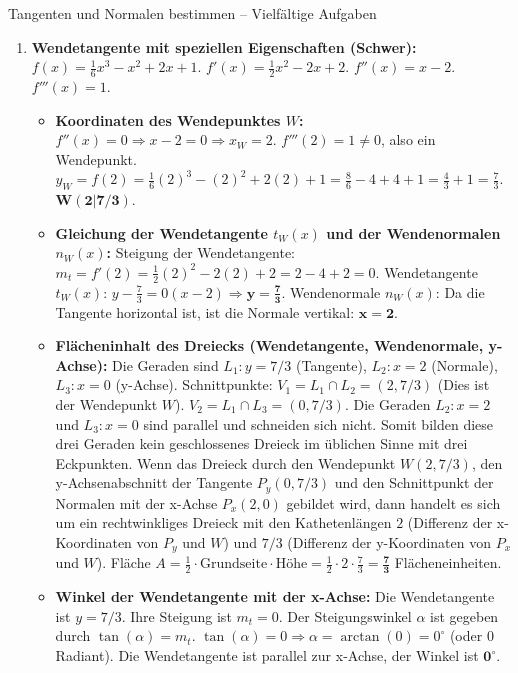 \begin{loesungsumgebung}{Tangenten und Normalen bestimmen – Vielfältige Aufgaben}
\begin{enumerate}[label=(\alph*)]
    \item \textbf{Wendetangente mit speziellen Eigenschaften (Schwer):}
    $f(x) = \frac{1}{6}x^3 - x^2 + 2x + 1$.
    $f'(x) = \frac{1}{2}x^2 - 2x + 2$.
    $f''(x) = x - 2$.
    $f'''(x) = 1$.
    \begin{itemize}
        \item \textbf{Koordinaten des Wendepunktes $W$:}
        $f''(x)=0 \Rightarrow x-2=0 \Rightarrow x_W=2$.
        $f'''(2)=1 \neq 0$, also ein Wendepunkt.
        $y_W = f(2) = \frac{1}{6}(2)^3 - (2)^2 + 2(2) + 1 = \frac{8}{6} - 4 + 4 + 1 = \frac{4}{3} + 1 = \frac{7}{3}$.
        $\mathbf{W(2 | 7/3)}$.
        \item \textbf{Gleichung der Wendetangente $t_W(x)$ und der Wendenormalen $n_W(x)$:}
        Steigung der Wendetangente: $m_t = f'(2) = \frac{1}{2}(2)^2 - 2(2) + 2 = 2 - 4 + 2 = 0$.
        Wendetangente $t_W(x)$: $y - \frac{7}{3} = 0(x-2) \Rightarrow \mathbf{y = \frac{7}{3}}$.
        Wendenormale $n_W(x)$: Da die Tangente horizontal ist, ist die Normale vertikal: $\mathbf{x = 2}$.
        \item \textbf{Flächeninhalt des Dreiecks (Wendetangente, Wendenormale, y-Achse):}
        Die Geraden sind $L_1: y=7/3$ (Tangente), $L_2: x=2$ (Normale), $L_3: x=0$ (y-Achse).
        Schnittpunkte:
        $V_1 = L_1 \cap L_2 = (2, 7/3)$ (Dies ist der Wendepunkt $W$).
        $V_2 = L_1 \cap L_3 = (0, 7/3)$.
        Die Geraden $L_2: x=2$ und $L_3: x=0$ sind parallel und schneiden sich nicht. Somit bilden diese drei Geraden kein geschlossenes Dreieck im üblichen Sinne mit drei Eckpunkten.
        Wenn das Dreieck durch den Wendepunkt $W(2, 7/3)$, den y-Achsenabschnitt der Tangente $P_y(0, 7/3)$ und den Schnittpunkt der Normalen mit der x-Achse $P_x(2,0)$ gebildet wird, dann handelt es sich um ein rechtwinkliges Dreieck mit den Kathetenlängen $2$ (Differenz der x-Koordinaten von $P_y$ und $W$) und $7/3$ (Differenz der y-Koordinaten von $P_x$ und $W$).
        Fläche $A = \frac{1}{2} \cdot \text{Grundseite} \cdot \text{Höhe} = \frac{1}{2} \cdot 2 \cdot \frac{7}{3} = \mathbf{\frac{7}{3}}$ Flächeneinheiten.
        \item \textbf{Winkel der Wendetangente mit der x-Achse:}
        Die Wendetangente ist $y = 7/3$. Ihre Steigung ist $m_t = 0$.
        Der Steigungswinkel $\alpha$ ist gegeben durch $\tan(\alpha) = m_t$.
        $\tan(\alpha) = 0 \Rightarrow \alpha = \arctan(0) = 0^\circ$ (oder $0$ Radiant).
        Die Wendetangente ist parallel zur x-Achse, der Winkel ist $\mathbf{0^\circ}$.
    \end{itemize}


\end{enumerate}
\end{loesungsumgebung}
